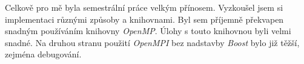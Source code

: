 Celkově pro mě byla semestrální práce velkým přínosem. Vyzkoušel jsem si implementaci různými způsoby a knihovnami.
Byl sem příjemně překvapen snadným používáním knihovny \textit{OpenMP}.
Úlohy s touto knihovnou byli velmi snadné.
Na druhou stranu použití \textit{OpenMPI} bez nadstavby \textit{Boost} bylo již těžší, 
zejména debugování.

